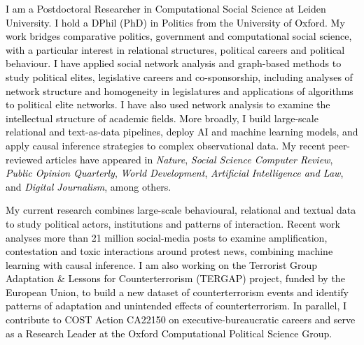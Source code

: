




\vspace{3mm}

\begin{cvparagraph}

\textcolor{black}{I am a Postdoctoral Researcher in Computational Social Science at Leiden University. I hold a DPhil (PhD) in Politics from the University of Oxford. My work bridges comparative politics, government and computational social science, with a particular interest in relational structures, political careers and political behaviour. I have applied social network analysis and graph-based methods to study political elites, legislative careers and co-sponsorship, including analyses of network structure and homogeneity in legislatures and applications of algorithms to political elite networks. I have also used network analysis to examine the intellectual structure of academic fields. More broadly, I build large-scale relational and text-as-data pipelines, deploy AI and machine learning models, and apply causal inference strategies to complex observational data. My recent peer-reviewed articles have appeared in {\itshape Nature}, {\itshape Social Science Computer Review}, {\itshape Public Opinion Quarterly}, {\itshape World Development}, {\itshape Artificial Intelligence and Law}, and {\itshape Digital Journalism}, among others.}

\textcolor{black}{My current research combines large-scale behavioural, relational and textual data to study political actors, institutions and patterns of interaction. Recent work analyses more than 21 million social-media posts to examine amplification, contestation and toxic interactions around protest news, combining machine learning with causal inference. I am also working on the Terrorist Group Adaptation \& Lessons for Counterterrorism (TERGAP) project, funded by the European Union, to build a new dataset of counterterrorism events and identify patterns of adaptation and unintended effects of counterterrorism. In parallel, I contribute to COST Action CA22150 on executive-bureaucratic careers and serve as a Research Leader at the Oxford Computational Political Science Group.}
\vspace{1mm}
\end{cvparagraph}

